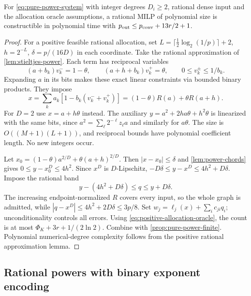 \begin{theorem}\label{thm:reciprocal-powers}
For \eqref{eq:pure-power-system} with integer degrees $D_i\ge2$,
rational dense input and the allocation oracle assumptions, a rational
MILP of polynomial size is constructible in polynomial time with
$p_{\mathrm{out}}\le p_{\mathrm{conv}}+13r/2+1$.
\end{theorem}
\begin{proof}
For a positive feasible rational allocation, set
$L=\lceil\frac12\log_2(1/p)\rceil+2$, $h=2^{-L}$,
$\delta=p/(16D)$ in each coordinate. Take the rational approximation
of \cref{lem:stieltjes-power}. Each term has reciprocal variables
\[
 (a+b_k)v_k^- =1-\theta,\qquad
 (a+h+b_k)v_k^+=\theta,\qquad 0\le v_k^\pm\le1/b_k.
\]
Expanding $a$ in its bits makes these exact linear constraints via
bounded binary products. They impose
\[
 x=\sum_k a_k[1-b_k(v_k^-+v_k^+)]
   =(1-\theta)R(a)+\theta R(a+h).
\]
For $D=2$ use $x=a+h\theta$ instead. The auxiliary
$y=a^2+2ha\theta+h^2\theta$ is linearized with the same bits,
since $a^2=\sum_\ell2^{-\ell}z_\ell a$ and similarly for
$a\theta$. The size is $O((M+1)(L+1))$, and reciprocal bounds
have polynomial coefficient length. No new integers occur.

Let $x_0=(1-\theta)a^{2/D}+\theta(a+h)^{2/D}$.
Then $|x-x_0|\le\delta$ and \cref{lem:power-chords} gives
$0\le y-x_0^D\le4h^2$. Since $x^D$ is $D$-Lipschitz,
$-D\delta\le y-x^D\le4h^2+D\delta$. Impose the rational band
\begin{equation}\label{eq:inverse-power-band}
 y-(4h^2+D\delta)\le q\le y+D\delta.
\end{equation}
The increasing endpoint-normalized $R$ covers every input, so the
whole graph is admitted, while $|q-x^D|\le4h^2+2D\delta\le3p/8$.
Set $w_j=\ell_j(x)+\sum_ic_{ji}q_i$; unconditionality controls
all errors. Using \eqref{eq:positive-allocation-oracle}, the count
is at most $\Phi_K+3r+1/(2\ln2)$. Combine with
\cref{prop:pure-power-finite}. Polynomial numerical-degree complexity
follows from the positive rational approximation lemma.
\end{proof}

\subsection{Rational powers with binary exponent encoding}


